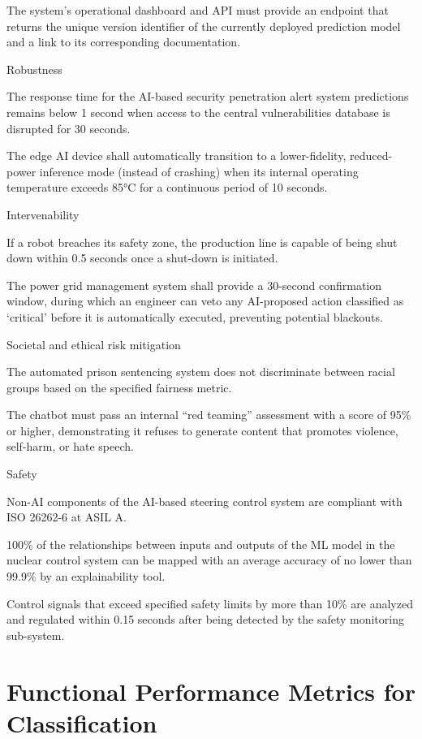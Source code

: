 \documentclass[
  letterpaper,
  DIV=11,
  numbers=noendperiod,
  oneside]{scrreprt}
\begin{document}
\begin{tcolorbox}
The system's operational dashboard and API must provide an endpoint that
returns the unique version identifier of the currently deployed
prediction model and a link to its corresponding documentation.

Robustness

The response time for the AI-based security penetration alert system
predictions remains below 1 second when access to the central
vulnerabilities database is disrupted for 30 seconds.

The edge AI device shall automatically transition to a lower-fidelity,
reduced-power inference mode (instead of crashing) when its internal
operating temperature exceeds 85°C for a continuous period of 10
seconds.

Intervenability

If a robot breaches its safety zone, the production line is capable of
being shut down within 0.5 seconds once a shut-down is initiated.

The power grid management system shall provide a 30-second confirmation
window, during which an engineer can veto any AI-proposed action
classified as `critical' before it is automatically executed, preventing
potential blackouts.

Societal and ethical risk mitigation

The automated prison sentencing system does not discriminate between
racial groups based on the specified fairness metric.

The chatbot must pass an internal ``red teaming'' assessment with a
score of 95\% or higher, demonstrating it refuses to generate content
that promotes violence, self-harm, or hate speech.

Safety

Non-AI components of the AI-based steering control system are compliant
with ISO 26262-6 at ASIL A.

100\% of the relationships between inputs and outputs of the ML model in
the nuclear control system can be mapped with an average accuracy of no
lower than 99.9\% by an explainability tool.

Control signals that exceed specified safety limits by more than 10\%
are analyzed and regulated within 0.15 seconds after being detected by
the safety monitoring sub-system.

\section{Functional Performance Metrics for
Classification}\label{sec-metrics-for-classification}


\end{tcolorbox}
\end{document}

